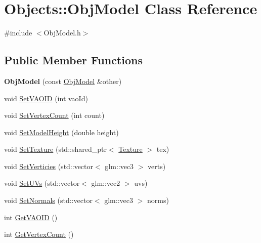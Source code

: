 \hypertarget{class_objects_1_1_obj_model}{}\section{Objects\+:\+:Obj\+Model Class Reference}
\label{class_objects_1_1_obj_model}


{\ttfamily \#include $<$Obj\+Model.\+h$>$}

\subsection*{Public Member Functions}
\begin{DoxyCompactItemize}
\item 
\mbox{\label{class_objects_1_1_obj_model_aa2d303c5c56929ba6a4ad241626f6c2f}} 
{\bfseries Obj\+Model} (const \hyperlink{class_objects_1_1_obj_model}{Obj\+Model} \&other)
\item 
void \hyperlink{class_objects_1_1_obj_model_a7a6747283cab7ded9bb454046bae15d7}{Set\+V\+A\+O\+ID} (int vao\+Id)
\item 
void \hyperlink{class_objects_1_1_obj_model_a863d5f8618de5bf3cc52de85181f178b}{Set\+Vertex\+Count} (int count)
\item 
void \hyperlink{class_objects_1_1_obj_model_a8dbe139248efa6ed1d9921e141262ee9}{Set\+Model\+Height} (double height)
\item 
void \hyperlink{class_objects_1_1_obj_model_a72ef59adfa1dd88840178aa76479e471}{Set\+Texture} (std\+::shared\+\_\+ptr$<$ \hyperlink{class_objects_1_1_texture}{Texture} $>$ tex)
\item 
void \hyperlink{class_objects_1_1_obj_model_aea0369b1cff1d80289d6378e8b98bc57}{Set\+Verticies} (std\+::vector$<$ glm\+::vec3 $>$ verts)
\item 
void \hyperlink{class_objects_1_1_obj_model_a33b342b503c772b35d8d8c557ec874b4}{Set\+U\+Vs} (std\+::vector$<$ glm\+::vec2 $>$ uvs)
\item 
void \hyperlink{class_objects_1_1_obj_model_aaa85b89c8fd001ad528a733483e1e7c9}{Set\+Normals} (std\+::vector$<$ glm\+::vec3 $>$ norms)
\item 
int \hyperlink{class_objects_1_1_obj_model_a197b62526db5e58e16e455bd6faf5da0}{Get\+V\+A\+O\+ID} ()
\item 
int \hyperlink{class_objects_1_1_obj_model_a816f3249aa96a8ac4ec39fcfb89e68e5}{Get\+Vertex\+Count} ()
\item 

\end{DoxyCompactItemize}
